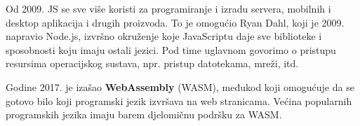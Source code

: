 Od 2009. JS se sve više koristi za programiranje i izradu servera, mobilnih i desktop aplikacija i drugih proizvoda.
To je omogućio Ryan Dahl, koji je 2009. napravio Node.js, izvršno okruženje koje JavaScriptu daje sve biblioteke i sposobnosti koju imaju ostali jezici.
Pod time uglavnom govorimo o pristupu resursima operacijskog sustava, npr. pristup datotekama, mreži, itd.

Godine 2017. je izašao \textbf{WebAssembly} (WASM), međukod koji omogućuje da se gotovo bilo koji programski jezik izvršava na web stranicama.
Većina popularnih programskih jezika imaju barem djelomičnu podršku za WASM.


